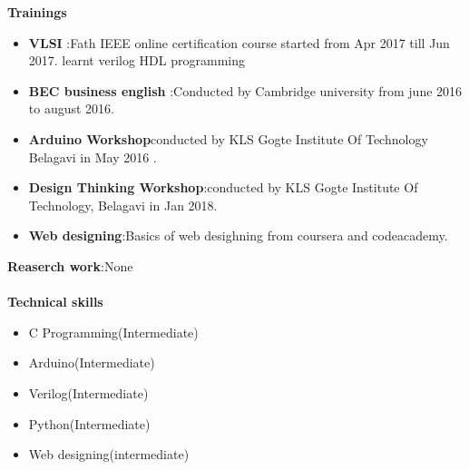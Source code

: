 \documentclass{article}
\begin{document}
\textbf{Trainings}\\[0.1cm]
\begin{itemize}
\item\textbf{ VLSI }:Fath
IEEE online certification course started from  Apr 2017 till Jun 2017.
learnt verilog HDL programming
\item\textbf{BEC business english }:Conducted by Cambridge university from june 2016 to august 2016.
\item\textbf{Arduino Workshop}conducted by KLS Gogte Institute Of Technology Belagavi in 
May 2016 .
\item\textbf{Design Thinking Workshop}:conducted by KLS Gogte Institute Of Technology, Belagavi in Jan 2018.
\item\textbf{Web designing}:Basics of web desighning from coursera and codeacademy. \\
\end{itemize}
\textbf{Reaserch work}:None\\~\\
\textbf{Technical skills}\\
\begin{itemize}
\item C Programming(Intermediate)
\item Arduino(Intermediate)
\item Verilog(Intermediate)
\item Python(Intermediate)
\item Web designing(intermediate)\\

\end{itemize}
\end{document}
